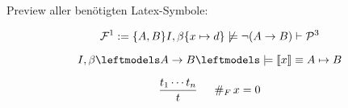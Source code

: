 

\date{Donnerstag 07.11.2019}


\maketitle


Preview aller benötigten Latex-Symbole:

$$ \mathcal{F}^{1} := \{ A, B\}  I, \beta \{x \mapsto d\} \not\models \lnot(A \to B) \vdash \mathcal{P}^{3} $$

$$ \Ib \lmodels A \to B\bimodels \llbracket x \rrbracket \equiv A \mapsto B$$


$$ \frac{t_1\cdots t_n}{t} \,\,\,\,\,\,\,\,\,  \#_{F}\, x = 0 $$



